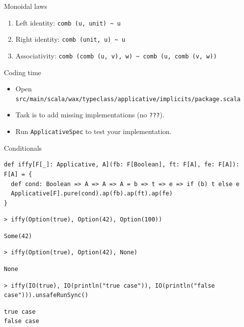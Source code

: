 \documentclass[presentation,aspectratio=169,smaller]{beamer}
\begin{document}
\begin{frame}[label={sec:org627c345},fragile]{Monoidal laws}
 \begin{enumerate}
\item Left identity: \texttt{comb (u, unit) \textasciitilde{} u}
\item Right identity: \texttt{comb (unit, u) \textasciitilde{} u}
\item Associativity: \texttt{comb (comb (u, v), w) \textasciitilde{} comb (u, comb (v, w))}
\end{enumerate}
\end{frame}

\begin{frame}[label={sec:org34ebe02},fragile]{Coding time}
 \begin{itemize}
\item Open \texttt{src/main/scala/wax/typeclass/applicative/implicits/package.scala}
\item Task is to add missing implementations (no \texttt{???}).
\item Run \texttt{ApplicativeSpec} to test your implementation.
\end{itemize}
\end{frame}

\begin{frame}[label={sec:org4f0f1a9},fragile]{Conditionals}
 \begin{verbatim}
def iffy[F[_]: Applicative, A](fb: F[Boolean], ft: F[A], fe: F[A]): F[A] = {
  def cond: Boolean => A => A => A = b => t => e => if (b) t else e
  Applicative[F].pure(cond).ap(fb).ap(ft).ap(fe)
}
\end{verbatim}

\pause

\begin{verbatim}
> iffy(Option(true), Option(42), Option(100))
\end{verbatim}

\pause

\begin{verbatim}
Some(42)
\end{verbatim}

\pause

\begin{verbatim}
> iffy(Option(true), Option(42), None)
\end{verbatim}

\pause

\begin{verbatim}
None
\end{verbatim}

\pause

\begin{verbatim}
> iffy(IO(true), IO(println("true case")), IO(println("false case"))).unsafeRunSync()
\end{verbatim}

\pause

\begin{verbatim}
true case
false case
\end{verbatim}
\end{frame}
\end{document}
